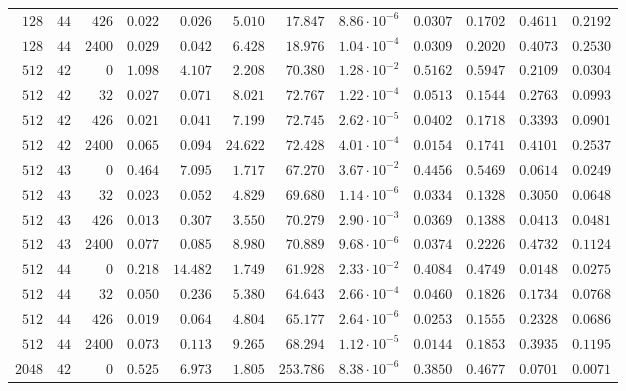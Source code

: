 \begin{table}[htbp]
\begin{tabular}{rrrrrrrrrrrr}
$128$ & $44$ & $426$  & $0.022$ & $0.026$   & $5.010$  & $17.847$  & $8.86\cdot10^{-6}$ & $0.0307$ & $0.1702$ & $0.4611$ & $0.2192$ \\
$128$ & $44$ & $2400$ & $0.029$ & $0.042$   & $6.428$  & $18.976$  & $1.04\cdot10^{-4}$ & $0.0309$ & $0.2020$ & $0.4073$ & $0.2530$ \\
\midrule
$512$ & $42$ & $0$    & $1.098$ & $4.107$   & $2.208$  & $70.380$  & $1.28\cdot10^{-2}$ & $0.5162$ & $0.5947$ & $0.2109$ & $0.0304$ \\
$512$ & $42$ & $32$   & $0.027$ & $0.071$   & $8.021$  & $72.767$  & $1.22\cdot10^{-4}$ & $0.0513$ & $0.1544$ & $0.2763$ & $0.0993$ \\
$512$ & $42$ & $426$  & $0.021$ & $0.041$   & $7.199$  & $72.745$  & $2.62\cdot10^{-5}$ & $0.0402$ & $0.1718$ & $0.3393$ & $0.0901$ \\
$512$ & $42$ & $2400$ & $0.065$ & $0.094$   & $24.622$ & $72.428$  & $4.01\cdot10^{-4}$ & $0.0154$ & $0.1741$ & $0.4101$ & $0.2537$ \\
$512$ & $43$ & $0$    & $0.464$ & $7.095$   & $1.717$  & $67.270$  & $3.67\cdot10^{-2}$ & $0.4456$ & $0.5469$ & $0.0614$ & $0.0249$ \\
$512$ & $43$ & $32$   & $0.023$ & $0.052$   & $4.829$  & $69.680$  & $1.14\cdot10^{-6}$ & $0.0334$ & $0.1328$ & $0.3050$ & $0.0648$ \\
$512$ & $43$ & $426$  & $0.013$ & $0.307$   & $3.550$  & $70.279$  & $2.90\cdot10^{-3}$ & $0.0369$ & $0.1388$ & $0.0413$ & $0.0481$ \\
$512$ & $43$ & $2400$ & $0.077$ & $0.085$   & $8.980$  & $70.889$  & $9.68\cdot10^{-6}$ & $0.0374$ & $0.2226$ & $0.4732$ & $0.1124$ \\
$512$ & $44$ & $0$    & $0.218$ & $14.482$  & $1.749$  & $61.928$  & $2.33\cdot10^{-2}$ & $0.4084$ & $0.4749$ & $0.0148$ & $0.0275$ \\
$512$ & $44$ & $32$   & $0.050$ & $0.236$   & $5.380$  & $64.643$  & $2.66\cdot10^{-4}$ & $0.0460$ & $0.1826$ & $0.1734$ & $0.0768$ \\
$512$ & $44$ & $426$  & $0.019$ & $0.064$   & $4.804$  & $65.177$  & $2.64\cdot10^{-6}$ & $0.0253$ & $0.1555$ & $0.2328$ & $0.0686$ \\
$512$ & $44$ & $2400$ & $0.073$ & $0.113$   & $9.265$  & $68.294$  & $1.12\cdot10^{-5}$ & $0.0144$ & $0.1853$ & $0.3935$ & $0.1195$ \\
\midrule
$2048$ & $42$ & $0$    & $0.525$ & $6.973$   & $1.805$  & $253.786$ & $8.38\cdot10^{-6}$ & $0.3850$ & $0.4677$ & $0.0701$ & $0.0071$ \\

\end{tabular}
\end{table}
